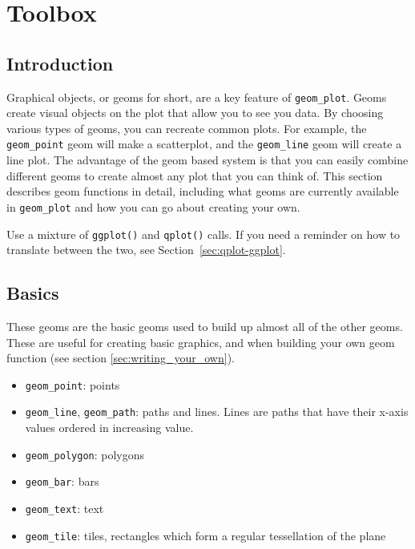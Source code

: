 

\chapter{Toolbox}
\label{cha:toolbox}

\section{Introduction}\label{sec:introduction}

Graphical objects, or geoms for short, are a key feature of {\tt geom\_plot}.  Geoms create visual objects on the plot that allow you to see you data.  By choosing various types of geoms, you can recreate common plots.  For example, the {\tt geom\_point} geom will make a scatterplot, and the {\tt geom\_line} geom will create a line plot.  The advantage of the geom based system is that you can easily combine different geoms to create almost any plot that you can think of.  This section describes geom functions in detail, including what geoms are currently available in {\tt geom\_plot} and how you can go about creating your own.

Use a mixture of {\tt ggplot()} and {\tt qplot()} calls.  If you need a reminder on how to translate between the two, see Section~\ref{sec:qplot-ggplot}.

\section{Basics}\label{sub:basics}

These geoms are the basic geoms used to build up almost all of the other geoms.  These are useful for creating basic graphics, and when building your own geom function (see section \ref{sec:writing_your_own}).

\begin{itemize}
  \item {\tt geom\_point}: points
  \item {\tt geom\_line}, {\tt geom\_path}: paths and lines.  Lines are paths that have their x-axis values ordered in increasing value.
  \item {\tt geom\_polygon}: polygons
  \item {\tt geom\_bar}: bars
  \item {\tt geom\_text}: text
  \item {\tt geom\_tile}: tiles, rectangles which form a regular tessellation of the plane
\end{itemize}

